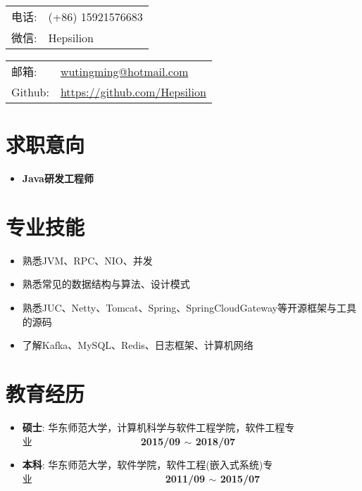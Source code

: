 \documentclass[letterpaper, UTF8, 11pt]{article}
\def\name{\textbf{\textcolor[rgb]{0.00, 0.00, 0.00}{\fontsize{30pt}{30pt}吴庭明}} ~~~~~~~~~ \fontsize{15pt}{15pt}}
\begin{document}
	
	\noindent{\bf \name} 
	\vspace{0.1in}

	\begin{minipage}{0.45\linewidth}
		\begin{tabular}{ll}
			电话:   & (+86) 15921576683 \\
			微信:   & Hepsilion \\
		\end{tabular}
	\end{minipage}
	\begin{minipage}{0.45\linewidth}
		\begin{tabular}{ll}
			邮箱:   & \href{mailto:wutingming@hotmail.com}{ wutingming@hotmail.com} \\
			Github: & \href{https://github.com/Hepsilion}{https://github.com/Hepsilion}\\
		\end{tabular}
	\end{minipage}
	\vspace{-0.1in}
	
	\section*{\textbf{求职意向}}\vspace{-0.12in}
	\begin{itemize}
		\item \textbf{Java研发工程师}
	\end{itemize}
	\vspace{-0.25in}
	
	\section*{\textbf{专业技能}}\vspace{-0.12in}
	\begin{itemize}
		\item 熟悉JVM、RPC、NIO、并发
		\item 熟悉常见的数据结构与算法、设计模式
		\item 熟悉JUC、Netty、Tomcat、Spring、SpringCloudGateway等开源框架与工具的源码
		\item 了解Kafka、MySQL、Redis、日志框架、计算机网络

	\end{itemize}
	\vspace{-0.25in}
	
	\section*{\textbf{教育经历}}\vspace{-0.12in}
	\begin{itemize}
		\item \textbf{硕士}: 华东师范大学，计算机科学与软件工程学院，软件工程专业~~~~~~~~~~~~~~~~~~~~~~\textbf{2015/09 $\sim$ 2018/07}
		\item \textbf{本科}: 华东师范大学，软件学院，软件工程(嵌入式系统)专业~~~~~~~~~~~~~~~~~~~~~~~~~~~\textbf{2011/09 $\sim$ 2015/07}
	\end{itemize}
	\vspace{-0.25in}
	
\end{document}
